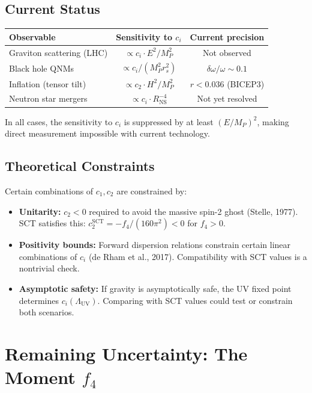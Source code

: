 \documentclass[11pt,a4paper]{article}
\begin{document}
\subsection{Current Status}

\begin{center}
\renewcommand{\arraystretch}{1.2}
\begin{tabular}{lcc}
  \toprule
  \textbf{Observable} & \textbf{Sensitivity to $c_i$} & \textbf{Current precision} \\
  \midrule
  Graviton scattering (LHC) & $\propto c_i \cdot E^2/M_P^2$ & Not observed \\
  Black hole QNMs & $\propto c_i/(M_P^2 r_s^2)$ & $\delta\omega/\omega \sim 0.1$ \\
  Inflation (tensor tilt) & $\propto c_2 \cdot H^2/M_P^2$ & $r < 0.036$ (BICEP3) \\
  Neutron star mergers & $\propto c_i \cdot R_{\text{NS}}^{-4}$ & Not yet resolved \\
  \bottomrule
\end{tabular}
\end{center}

\noindent
In all cases, the sensitivity to $c_i$ is suppressed by at least $(E/M_P)^2$, making direct measurement impossible with current technology.

\subsection{Theoretical Constraints}

Certain combinations of $c_1, c_2$ are constrained by:
\begin{itemize}
  \item \textbf{Unitarity:} $c_2 < 0$ required to avoid the massive spin-2 ghost (Stelle, 1977). SCT satisfies this: $c_2^{\text{SCT}} = -f_4/(160\pi^2) < 0$ for $f_4 > 0$.
  \item \textbf{Positivity bounds:} Forward dispersion relations constrain certain linear combinations of $c_i$ (de Rham et al., 2017). Compatibility with SCT values is a nontrivial check.
  \item \textbf{Asymptotic safety:} If gravity is asymptotically safe, the UV fixed point determines $c_i(\Lambda_{\text{UV}})$. Comparing with SCT values could test or constrain both scenarios.
\end{itemize}

\section{Remaining Uncertainty: The Moment $f_4$}
\end{document}
